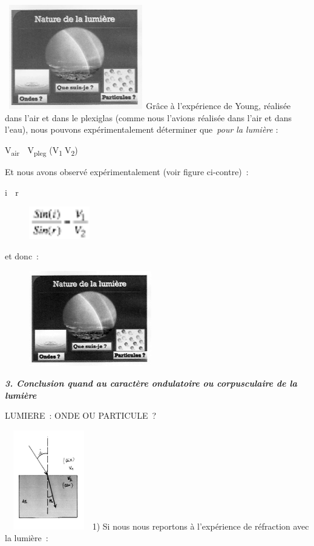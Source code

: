 \includegraphics[width=6.172cm,height=4.551cm]{Pictures/10000001000000F8000000C25D3572F9FC1A2068.png}Grâce
à l'expérience de Young, réalisée dans l'air et dans le plexiglas (comme
nous l'avions réalisée dans l'air et dans l'eau), nous pouvons
expérimentalement déterminer que~\emph{pour la lumière }:

V\textsubscript{air } V\textsubscript{pleg
}(V\textsubscript{1}V\textsubscript{2})

Et nous avons observé expérimentalement (voir figure ci-contre)~:

i  r

\begin{figure}
\centering
\includegraphics[width=2.634cm,height=1.412cm]{Pictures/100000010000002B00000017F74A96A4365CCDCA.png}
\caption{}
\end{figure}

et donc~:

\begin{figure}
\centering
\includegraphics[width=5.366cm,height=4.175cm]{Pictures/10000001000000F8000000C2693C9AC6103FFED7.png}
\caption{}
\end{figure}

\emph{\textbf{3. Conclusion quand au caractère ondulatoire ou
corpusculaire de la lumière }}

LUMIERE~: ONDE OU PARTICULE~?

\includegraphics[width=3.829cm,height=4.334cm]{Pictures/1000000100000102000001673F5D940D6E4D1166.png}1)
Si nous nous reportons à l'expérience de réfraction avec la lumière~:


